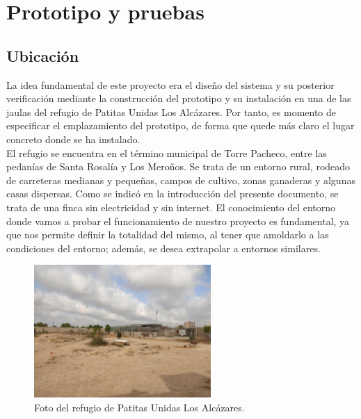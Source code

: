 \documentclass[12pt]{article}
\begin{document}
	\pagebreak
	
	
	\section[Prototipo y pruebas]{Prototipo y pruebas}
	\label{Section: prototipo y pruebas}
	\subsection[Ubicación]{Ubicación}

	\noindent La idea fundamental de este proyecto era el diseño del sistema y su posterior verificación mediante la construcción del prototipo y su instalación en una de las jaulas del refugio de Patitas Unidas Los Alcázares. Por tanto, es momento de especificar el emplazamiento del prototipo, de forma que quede más claro el lugar concreto donde se ha instalado. \\
	
	\noindent El refugio se encuentra en el término municipal de Torre Pacheco, entre las pedanías de Santa Rosalía y Los Meroños. Se trata de un entorno rural, rodeado de carreteras medianas y pequeñas, campos de cultivo, zonas ganaderas y algunas casas dispersas. Como se indicó en la introducción del presente documento, se trata de una finca sin electricidad y sin internet. El conocimiento del entorno donde vamos a probar el funcionamiento de nuestro proyecto es fundamental, ya que nos permite definir la totalidad del mismo, al tener que amoldarlo a las condiciones del entorno; además, se desea extrapolar a entornos similares. \\
	
	\begin{figure}[h!]
		\begin{center}
			\includegraphics[width=0.6\textwidth]{img/refugio_global.jpg}
			\caption{Foto del refugio de Patitas Unidas Los Alcázares.}
			\label{Foto global refugio}
		\end{center}
	\end{figure}
	
\end{document}
